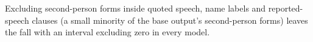 Excluding second-person forms inside quoted speech, name labels and reported-speech clauses (a small minority of the base output's second-person forms) leaves the fall with an interval excluding zero in every model.
